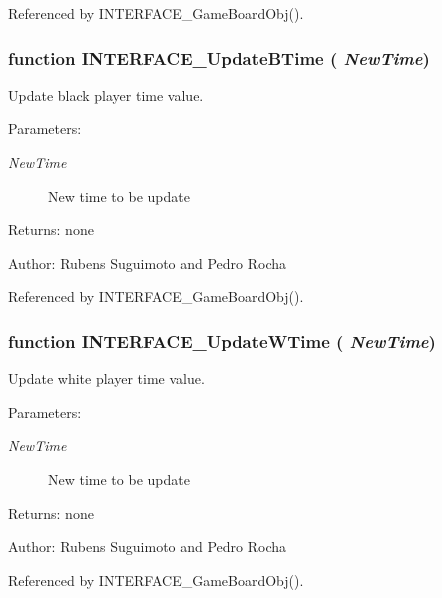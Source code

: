 Referenced by INTERFACE\_\-GameBoardObj().
\subsubsection[INTERFACE\_\-UpdateBTime]{\setlength{\rightskip}{0pt plus 5cm}function INTERFACE\_\-UpdateBTime ( {\em NewTime})}\label{interface_2game_8js_14d8b46e0643124a6cc918b9477fd052}


Update black player time value. 

\begin{Desc}
\item[Parameters:]
\begin{description}
\item[{\em NewTime}]New time to be update \end{description}
\end{Desc}
\begin{Desc}
\item[Returns:]none \end{Desc}
\begin{Desc}
\item[Author:]Rubens Suguimoto and Pedro Rocha \end{Desc}


Referenced by INTERFACE\_\-GameBoardObj().
\subsubsection[INTERFACE\_\-UpdateWTime]{\setlength{\rightskip}{0pt plus 5cm}function INTERFACE\_\-UpdateWTime ( {\em NewTime})}\label{interface_2game_8js_c4dee69f9172156070d175a2da5e62ba}


Update white player time value. 

\begin{Desc}
\item[Parameters:]
\begin{description}
\item[{\em NewTime}]New time to be update \end{description}
\end{Desc}
\begin{Desc}
\item[Returns:]none \end{Desc}
\begin{Desc}
\item[Author:]Rubens Suguimoto and Pedro Rocha \end{Desc}


Referenced by INTERFACE\_\-GameBoardObj().